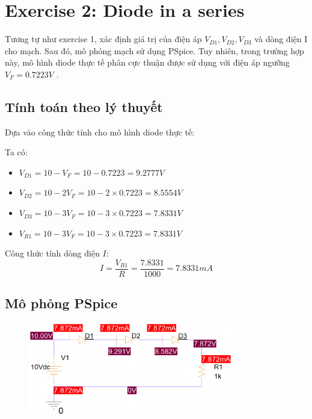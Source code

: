 \section{Exercise 2: Diode in a series}

Tương tự như exercise 1, xác định giá trị của điện áp \(V_{D1}, V_{D2}, V_{D3}\) và dòng điện I cho mạch. Sau đó, mô phỏng mạch sử dụng PSpice. Tuy nhiên, trong trường hợp này, mô hình diode thực tế phân cực thuận được sử dụng với điện áp ngưỡng \(V_{F} = 0.7223V\) .

\subsection{Tính toán theo lý thuyết}   

Dựa vào công thức tính cho mô hình diode thực tế:
    
    Ta có: 
\begin{itemize}
    
    \item \(V_{D1} = 10 - V_{F} = 10 - 0.7223 = 9.2777V\)

    \item \(V_{D2} = 10 - 2V_{F} = 10 - 2 \times 0.7223 = 8.5554 V\)

    \item \(V_{D3} = 10 - 3V_{F} = 10 - 3 \times 0.7223 = 7.8331 V\)
    
    \item \(V_{R1} = 10 - 3V_{F} = 10 - 3 \times 0.7223 = 7.8331 V\)
    
\end{itemize}

Công thức tính dòng điện \(I\):
\[
    I = \frac{V_{R1}}{R} = \frac{7.8331}{1000} = 7.8331 mA
\]
\subsection{Mô phỏng PSpice}

\begin{figure}[!htbp]
    \centering
    \includegraphics[width=0.8\textwidth]{graphics/ex2/f1.png}
\end{figure}

